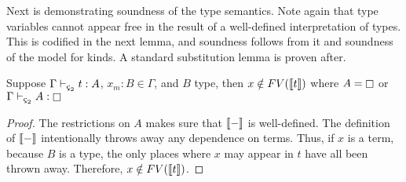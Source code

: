 Next is demonstrating soundness of the type semantics.
Note again that type variables cannot appear free in the result of a well-defined interpretation of types.
This is codified in the next lemma, and soundness follows from it and soundness of the model for kinds.
A standard substitution lemma is proven after.

\begin{lemma}
    \label{lem:3:var_not_in_sema_when_kind}
    Suppose $\Gamma \vdash_{\ced} t : A$, $x_m : B \in \Gamma$, and $B$ type, then $x \notin FV(\llbracket t \rrbracket)$
    where $A = \kind$ or $\Gamma \vdash_{\ced} A : \kind$
\end{lemma}
\begin{proof}
    The restrictions on $A$ makes sure that $\llbracket - \rrbracket$ is well-defined.
    The definition of $\llbracket - \rrbracket$ intentionally throws away any dependence on terms.
    Thus, if $x$ is a term, because $B$ is a type, the only places where $x$ may appear in $t$ have all been thrown away.
    Therefore, $x \notin FV(\llbracket t \rrbracket)$.
\end{proof}

